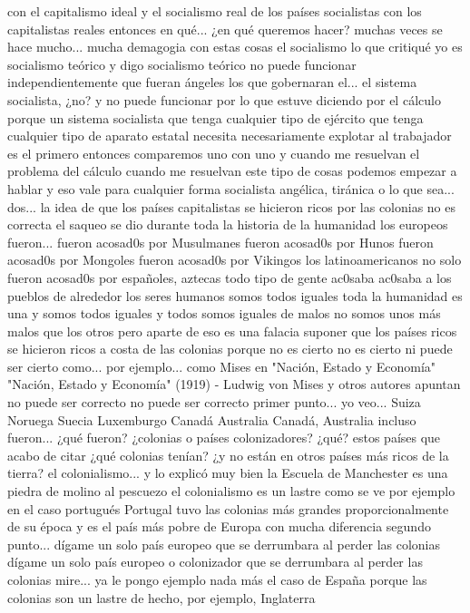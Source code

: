 con el capitalismo ideal y el socialismo real de los países socialistas con los capitalistas reales entonces en qué... ¿en qué queremos hacer?
muchas veces se hace mucho... mucha demagogia con estas cosas el socialismo lo que critiqué yo es socialismo teórico
y digo socialismo teórico no puede funcionar independientemente que fueran ángeles los que gobernaran el...
el sistema socialista, ¿no? y no puede funcionar por lo que estuve diciendo por el cálculo porque un sistema socialista
que tenga cualquier tipo de ejército que tenga cualquier tipo de aparato estatal necesita necesariamente explotar al trabajador es el primero
entonces comparemos uno con uno y cuando me resuelvan el problema del cálculo cuando me resuelvan este tipo de cosas podemos empezar a hablar
y eso vale para cualquier forma socialista angélica, tiránica o lo que sea...
dos... la idea de que los países capitalistas se hicieron ricos por las colonias no es correcta
el saqueo se dio durante toda la historia de la humanidad los europeos fueron... fueron acosad0s por Musulmanes
fueron acosad0s por Hunos fueron acosad0s por Mongoles fueron acosad0s por Vikingos
los latinoamericanos no solo fueron acosad0s por españoles, aztecas todo tipo de gente ac0saba ac0saba a los pueblos de alrededor
los seres humanos somos todos iguales toda la humanidad es una y somos todos iguales y todos somos iguales de malos no somos unos más malos que los otros
pero aparte de eso es una falacia suponer que los países ricos se hicieron ricos a costa de las colonias
porque no es cierto no es cierto ni puede ser cierto como... por ejemplo... como Mises en "Nación, Estado y Economía"
"Nación, Estado y Economía" (1919) - Ludwig von Mises
y otros autores apuntan no puede ser correcto no puede ser correcto primer punto...
yo veo... Suiza Noruega
Suecia Luxemburgo Canadá
Australia Canadá, Australia incluso fueron... ¿qué fueron? ¿colonias o países colonizadores?
¿qué? estos países que acabo de citar ¿qué colonias tenían?
¿y no están en otros países más ricos de la tierra? el colonialismo...
y lo explicó muy bien la Escuela de Manchester es una piedra de molino al pescuezo el colonialismo es un lastre como se ve por ejemplo en el caso portugués
Portugal tuvo las colonias más grandes proporcionalmente de su época y es el país más pobre de Europa con mucha diferencia
segundo punto... dígame un solo país europeo que se derrumbara al perder las colonias
dígame un solo país europeo o colonizador que se derrumbara al perder las colonias mire...
ya le pongo ejemplo nada más el caso de España porque las colonias son un lastre de hecho, por ejemplo, Inglaterra
